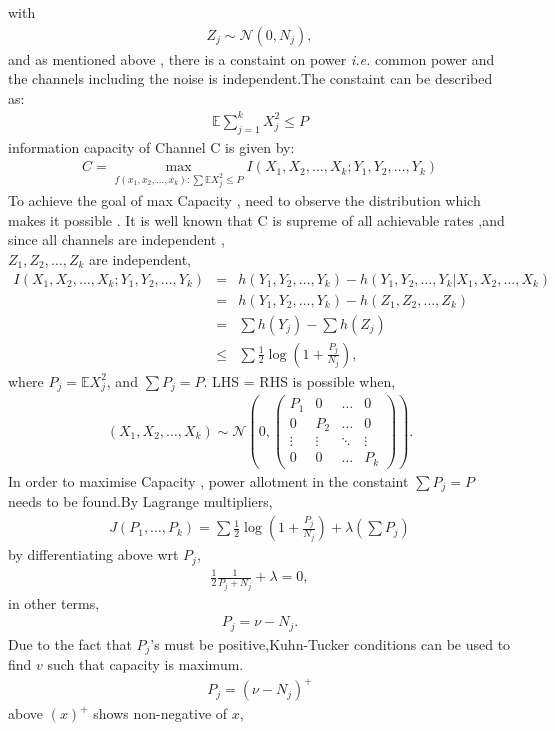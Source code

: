 %
with
\begin{eqnarray}
    Z_j \sim \mathcal{N}(0, N_j),
\end{eqnarray}
%
and as mentioned above , there is a constaint on power \textit{i.e.} common power and the channels including the noise is independent.The constaint can be described as:
%
\begin{eqnarray}
    \mathbb{E} \sum_{j=1}^{k} X_j^2 \leq P
\end{eqnarray}
%
information capacity of Channel C is given by:
%
\begin{eqnarray}
    C = \max_{f(x_1, x_2, \dots, x_k) : \sum \mathbb{E} X_j^2 \leq P} I(X_1, X_2, \dots, X_k ; Y_1, Y_2, \dots, Y_k)
\end{eqnarray}
%
To achieve the goal of {max Capacity} , need to observe the distribution which makes it possible . It is well known that C is supreme of all achievable rates ,and since all channels are independent ,
\\
\( Z_1, Z_2, \dots, Z_k \) are independent,
%
\begin{eqnarray}
    I(X_1, X_2, \dots, X_k; Y_1, Y_2, \dots, Y_k) &=& h(Y_1, Y_2, \dots, Y_k) - h(Y_1, Y_2, \dots, Y_k | X_1, X_2, \dots, X_k) \\
    &=& h(Y_1, Y_2, \dots, Y_k) - h(Z_1, Z_2, \dots, Z_k) \\
    &=& \sum h(Y_j) - \sum h(Z_j) \\
    &\leq& \sum \frac{1}{2} \log \left( 1 + \frac{P_j}{N_j} \right),
\end{eqnarray}
%
where \( P_j = \mathbb{E} X_j^2 \), and \( \sum P_j = P \). 
LHS = RHS  is possible when,
%
\begin{eqnarray}
    (X_1, X_2, \dots, X_k) \sim \mathcal{N} \left( 0, \begin{pmatrix} P_1 & 0 & \dots & 0 \\ 0 & P_2 & \dots & 0 \\ \vdots & \vdots & \ddots & \vdots \\ 0 & 0 & \dots & P_k \end{pmatrix} \right).
\end{eqnarray}
%
In order to maximise Capacity , power allotment in the constaint \( \sum P_j = P \) needs to be found.By Lagrange multipliers,
%
\begin{eqnarray}
    J(P_1, \dots, P_k) = \sum \frac{1}{2} \log \left( 1 + \frac{P_j}{N_j} \right) + \lambda \left( \sum P_j \right)
\end{eqnarray}
%
by differentiating above {wrt} \( P_j \), 
%
\begin{eqnarray}
    \frac{1}{2} \frac{1}{P_j + N_j} + \lambda = 0,
\end{eqnarray}
%
in other terms,
%
\begin{eqnarray}
    P_j = \nu - N_j.
\end{eqnarray}
%
Due to the fact that \( P_j \)'s must be positive,Kuhn-Tucker conditions can be used to find $v$ such that capacity is maximum.
%
\begin{eqnarray}
    P_j = (\nu - N_j)^+
\end{eqnarray}
%
above $(x)^+$ shows non-negative of $x$,

